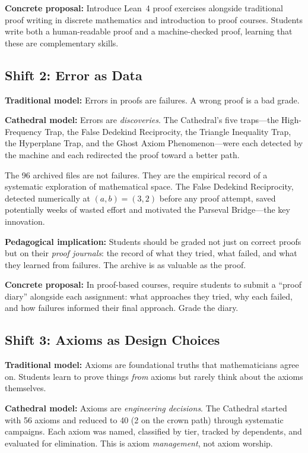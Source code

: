 \documentclass[11pt,a4paper]{article}
\begin{document}
\textbf{Concrete proposal:} Introduce Lean~4 proof exercises alongside
traditional proof writing in discrete mathematics and introduction
to proof courses. Students write both a human-readable proof and a
machine-checked proof, learning that these are complementary skills.

\subsection{Shift 2: Error as Data}

\textbf{Traditional model:} Errors in proofs are failures. A wrong
proof is a bad grade.

\textbf{Cathedral model:} Errors are \emph{discoveries}. The
Cathedral's five traps---the High-Frequency Trap, the False Dedekind
Reciprocity, the Triangle Inequality Trap, the Hyperplane Trap, and
the Ghost Axiom Phenomenon---were each detected by the machine and
each redirected the proof toward a better path.

The 96 archived files are not failures. They are the empirical record
of a systematic exploration of mathematical space. The False Dedekind
Reciprocity, detected numerically at $(a,b) = (3,2)$ before any proof
attempt, saved potentially weeks of wasted effort and motivated the
Parseval Bridge---the key innovation.

\textbf{Pedagogical implication:} Students should be graded not just
on correct proofs but on their \emph{proof journals}: the record of
what they tried, what failed, and what they learned from failures.
The archive is as valuable as the proof.

\textbf{Concrete proposal:} In proof-based courses, require students
to submit a ``proof diary'' alongside each assignment: what approaches
they tried, why each failed, and how failures informed their
final approach. Grade the diary.

\subsection{Shift 3: Axioms as Design Choices}

\textbf{Traditional model:} Axioms are foundational truths that
mathematicians agree on. Students learn to prove things \emph{from}
axioms but rarely think about the axioms themselves.

\textbf{Cathedral model:} Axioms are \emph{engineering decisions}.
The Cathedral started with 56 axioms and reduced to 40 (2 on the
crown path) through systematic campaigns. Each axiom was named,
classified by tier, tracked by dependents, and evaluated for
elimination. This is axiom \emph{management}, not axiom worship.
\end{document}
